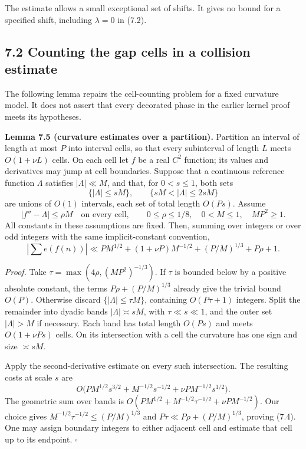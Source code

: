 \documentclass[11pt,a4paper]{article}
\begin{document}
The estimate allows a small exceptional set of shifts. It gives no bound
for a specified shift, including \(\lambda=0\) in (7.2).

\subsection{7.2 Counting the gap cells in a collision
estimate}\label{counting-the-gap-cells-in-a-collision-estimate}

The following lemma repairs the cell-counting problem for a fixed
curvature model. It does not assert that every decorated phase in the
earlier kernel proof meets its hypotheses.


\textbf{Lemma 7.5 (curvature estimates over a partition).} Partition an
interval of length at most \(P\) into interval cells, so that every
subinterval of length \(L\) meets \(O(1+\nu L)\) cells. On each cell let
\(f\) be a real \(C^2\) function; its values and derivatives may jump at
cell boundaries. Suppose that a continuous reference function
\(\Lambda\) satisfies \(|\Lambda|\ll M\), and that, for \(0<s\le1\),
both sets \[
\{|\Lambda|\le sM\},\qquad \{sM<|\Lambda|\le2sM\}
\] are unions of \(O(1)\) intervals, each set of total length \(O(Ps)\).
Assume \[
|f''-\Lambda|\le\rho M\quad\text{on every cell},\qquad
0\le\rho\le1/8,\quad 0<M\le1,\quad MP^2\ge1.
\] All constants in these assumptions are fixed. Then, summing over
integers or over odd integers with the same implicit-constant
convention, \[
\left|\sum e(f(n))\right|
\ll P M^{1/2}+(1+\nu P)M^{-1/2}
+(P/M)^{1/3}+P\rho+1.
\tag{7.4}
\]

\emph{Proof.} Take \(\tau=\max(4\rho,(MP^2)^{-1/3})\). If \(\tau\) is
bounded below by a positive absolute constant, the terms
\(P\rho+(P/M)^{1/3}\) already give the trivial bound \(O(P)\). Otherwise
discard \(\{|\Lambda|\le\tau M\}\), containing \(O(P\tau+1)\) integers.
Split the remainder into dyadic bands \(|\Lambda|\asymp sM\), with
\(\tau\ll s\ll1\), and the outer set \(|\Lambda|>M\) if necessary. Each
band has total length \(O(Ps)\) and meets \(O(1+\nu Ps)\) cells. On its
intersection with a cell the curvature has one sign and size
\(\asymp sM\).

Apply the second-derivative estimate on every such intersection. The
resulting costs at scale \(s\) are \[
O\bigl(PM^{1/2}s^{3/2}
+M^{-1/2}s^{-1/2}+\nu P M^{-1/2}s^{1/2}\bigr).
\] The geometric sum over bands is
\(O(PM^{1/2}+M^{-1/2}\tau^{-1/2}+\nu PM^{-1/2})\). Our choice gives
\(M^{-1/2}\tau^{-1/2}\le(P/M)^{1/3}\) and
\(P\tau\ll P\rho+(P/M)^{1/3}\), proving (7.4). One may assign boundary
integers to either adjacent cell and estimate that cell up to its
endpoint. \(\square\)
\end{document}
